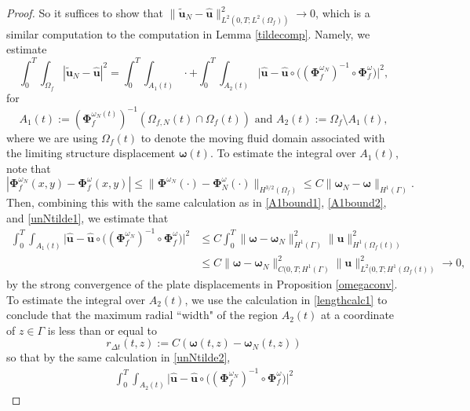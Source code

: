 \documentclass[11pt]{article}
\newcommand{\bd}{\boldsymbol}
\theoremstyle{definition}
\begin{document}
\begin{proof}
So it suffices to show that $\|\tilde{\bd{u}}_{N} - \hat{\bd{u}}\|_{L^{2}(0, T; L^{2}(\Omega_{f}))}^{2} \to 0$, which is a similar computation to the computation in Lemma \ref{tildecomp}. Namely, we estimate
\begin{equation*}
\int_{0}^{T} \int_{\Omega_{f}} |\tilde{\bd{u}}_{N} - \hat{\bd{u}}|^{2} = \int_{0}^{T} \int_{A_{1}(t)} \cdot + \int_{0}^{T} \int_{A_{2}(t)} \Big|\hat{\bd{u}} - \hat{\bd{u}} \circ \Big((\bd{\Phi}^{\omega_{N}}_{f})^{-1} \circ \bd{\Phi}^{\omega}_{f}\Big)\Big|^{2},
\end{equation*}
for
\begin{equation*}
A_{1}(t) := (\bd{\Phi}^{\omega_{N}(t)}_{f})^{-1} (\Omega_{f, N}(t) \cap \Omega_{f}(t)) \text{ and } A_{2}(t) := \Omega_{f} \setminus A_{1}(t),
\end{equation*}
where we are using $\Omega_{f}(t)$ to denote the moving fluid domain associated with the limiting structure displacement $\bd{\omega}(t)$. To estimate the integral over $A_{1}(t)$, note that
\begin{equation*}
|\bd{\Phi}^{\omega_{N}}_{f}(x, y) - \bd{\Phi}^{\omega}_{f}(x, y)| \le \|\bd{\Phi}^{\omega_{N}}(\cdot) - \bd{\Phi}^{\omega}_{N}(\cdot)\|_{H^{3/2}(\Omega_{f})} \le C\|\bd{\omega}_{N} - \bd{\omega}\|_{H^{1}(\Gamma)}.
\end{equation*}
Then, combining this with the same calculation as in \eqref{A1bound1}, \eqref{A1bound2}, and \eqref{unNtilde1}, we estimate that
\begin{align}\label{A1final}
\int_{0}^{T} \int_{A_{1}(t)} \Big|\hat{\bd{u}} - \hat{\bd{u}} \circ \Big((\bd{\Phi}^{\omega_{N}}_{f})^{-1} \circ \bd{\Phi}^{\omega}_{f}\Big)\Big|^{2} &\le C\int_{0}^{T} \|\bd{\omega} - \bd{\omega}_{N}\|_{H^{1}(\Gamma)}^{2} \|\bd{u}\|_{H^{1}(\Omega_{f}(t))}^{2} \nonumber \\
&\le C\|\bd{\omega} - \bd{\omega}_{N}\|_{C(0, T; H^{1}(\Gamma)}^{2} \|\bd{u}\|^{2}_{L^{2}(0, T; H^{1}(\Omega_{f}(t))} \to 0,
\end{align}
by the strong convergence of the plate displacements in Proposition \ref{omegaconv}. To estimate the integral over $A_{2}(t)$, we use the calculation in \eqref{lengthcalc1} to conclude that the maximum radial ``width" of the region $A_{2}(t)$ at a coordinate of $z \in \Gamma$ is less than or equal to $$r_{\Delta t}(t, z) := C(\bd{\omega}(t, z) - \bd{\omega}_{N}(t, z))$$ so that by the same calculation in \eqref{unNtilde2},
\begin{align}\label{A2final}
\int_{0}^{T} \int_{A_{2}(t)} \Big|\hat{\bd{u}} - \hat{\bd{u}} \circ \Big((\bd{\Phi}^{\omega_{N}}_{f})^{-1} \circ \bd{\Phi}^{\omega}_{f}\Big)\Big|^{2} %

\end{align}
\end{proof}
\end{document}
